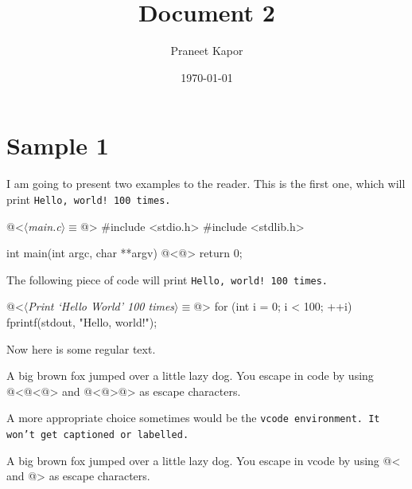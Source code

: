 \documentclass{article}
\begin{document}
\title{Document 2}
\author{Praneet Kapor}
\date{\today}
\maketitle

\section{Sample 1}
I am going to present two examples to the reader. This is the first one, which will print \tt Hello, world!
\rm 100 times.

\begin{code}[main.c]
@<$\langle$\textit{main.c}$\rangle \equiv$@>
#include <stdio.h>
#include <stdlib.h>

int main(int argc, char **argv)
{
    @<@>
    return 0;
}
\end{code}

The following piece of code will print \tt Hello, world! \rm 100 times.

\begin{code}
@<$\langle$\textit{Print `Hello World' 100 times}$\rangle \equiv$@>
for (int i = 0; i < 100; ++i)
{
    fprintf(stdout, "Hello, world!\n");
}
\end{code}

Now here is some regular text.
\begin{code}
A big brown fox jumped over a little lazy dog.
You escape in code by using @<@<@> and @<@>@> as escape characters.
\end{code}

A more appropriate choice sometimes would be the \tt vcode \rm environment. It won't get captioned or
labelled.
\begin{vcode}
A big brown fox jumped over a little lazy dog.
You escape in vcode by using @< and @> as escape characters.
\end{vcode}

\lstlistoflistings
\end{document}
